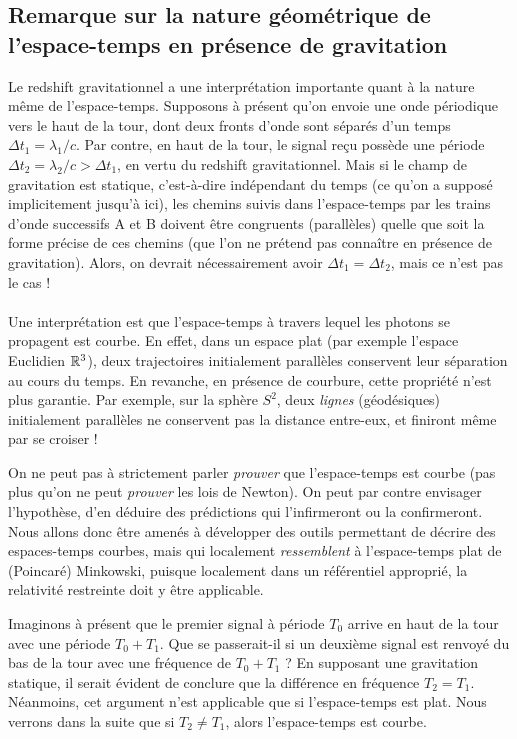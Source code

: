\subsection{Remarque sur la nature géométrique de l'espace-temps en présence de gravitation}
Le redshift gravitationnel a une interprétation importante quant à la nature même de l'espace-temps. Supposons à présent qu'on envoie une onde périodique vers le haut de la tour, dont deux fronts d'onde sont séparés d'un temps $\Delta t_1 = \lambda_1/c$. Par contre, en haut de la tour, le signal reçu possède une période $\Delta t_2 = \lambda_2/c > \Delta t_1$, en vertu du redshift gravitationnel. Mais si le champ de gravitation est statique, c'est-à-dire indépendant du temps (ce qu'on a supposé implicitement jusqu'à ici), les chemins suivis dans l'espace-temps par les trains d'onde successifs A et B doivent être congruents (parallèles) quelle que soit la forme précise de ces chemins (que l'on ne prétend pas connaître en présence de gravitation). Alors, on devrait nécessairement avoir $\Delta t_1 = \Delta t_2$, mais ce n'est pas le cas ! \\
\\
Une interprétation est que l'espace-temps à travers lequel les photons se propagent est courbe. En effet, dans un espace plat (par exemple l'espace Euclidien $\mathbb{R}^3$), deux trajectoires initialement parallèles conservent leur séparation au cours du temps. En revanche, en présence de courbure, cette propriété n'est plus garantie. Par exemple, sur la sphère $S^2$, deux \emph{lignes} (géodésiques) initialement parallèles ne conservent pas la distance entre-eux, et finiront même par se croiser !

On ne peut pas à strictement parler \emph{prouver} que l'espace-temps est courbe (pas plus qu'on ne peut \emph{prouver} les lois de Newton). On peut par contre envisager l'hypothèse, d'en déduire des prédictions qui l'infirmeront ou la confirmeront. Nous allons donc être amenés à développer des outils permettant de décrire des espaces-temps courbes, mais qui localement \emph{ressemblent} à l'espace-temps plat de (Poincaré) Minkowski, puisque localement dans un référentiel approprié, la relativité restreinte doit y être applicable.

Imaginons à présent que le premier signal à période $T_0$ arrive en haut de la tour avec une période $T_0+T_1$. Que se passerait-il si un deuxième signal est renvoyé du bas de la tour avec une fréquence de $T_0+T_1$ ? En supposant une gravitation statique, il serait évident de conclure que la différence en fréquence $T_2 = T_1$. Néanmoins, cet argument n'est applicable que si l'espace-temps est plat. Nous verrons dans la suite que si $T_2 \neq T_1$, alors l'espace-temps est courbe.

